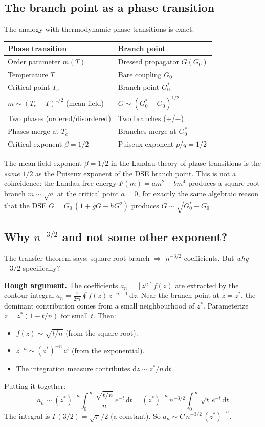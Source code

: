 \documentclass[11pt,a4paper]{article}
\theoremstyle{definition}
\newcommand{\dd}{\mathrm{d}}
\begin{document}
\subsection{The branch point as a phase transition}

The analogy with thermodynamic phase transitions is exact:

\begin{center}
\renewcommand{\arraystretch}{1.3}
\begin{tabular}{ll}
\toprule
\textbf{Phase transition} & \textbf{Branch point} \\
\midrule
Order parameter $m(T)$ & Dressed propagator $G(G_0)$ \\
Temperature $T$ & Bare coupling $G_0$ \\
Critical point $T_c$ & Branch point $G_0^*$ \\
$m \sim (T_c - T)^{1/2}$ (mean-field) & $G \sim (G_0^* - G_0)^{1/2}$ \\
Two phases (ordered/disordered) & Two branches ($+$/$-$) \\
Phases merge at $T_c$ & Branches merge at $G_0^*$ \\
Critical exponent $\beta = 1/2$ & Puiseux exponent $p/q = 1/2$ \\
\bottomrule
\end{tabular}
\end{center}

The mean-field exponent $\beta = 1/2$ in the Landau theory of phase
transitions is the \emph{same} $1/2$ as the Puiseux exponent of the DSE
branch point. This is not a coincidence: the Landau free energy
$F(m) = am^2 + bm^4$ produces a square-root branch $m \sim \sqrt{a}$
at the critical point $a = 0$, for exactly the same algebraic reason
that the DSE $G = G_0\,(1 + gG - hG^2)$ produces $G \sim \sqrt{G_0^* - G_0}$.

\subsection{Why $n^{-3/2}$ and not some other exponent?}

The transfer theorem says: square-root branch $\Rightarrow$ $n^{-3/2}$
coefficients. But \emph{why} $-3/2$ specifically?

\textbf{Rough argument.} The coefficients $a_n = [z^n]f(z)$ are extracted
by the contour integral $a_n = \frac{1}{2\pi i}\oint f(z)\, z^{-n-1}\,\dd z$.
Near the branch point at $z = z^*$, the dominant contribution comes from
a small neighbourhood of $z^*$. Parameterize $z = z^*(1 - t/n)$ for small
$t$. Then:
\begin{itemize}
\item $f(z) \sim \sqrt{t/n}$ (from the square root).
\item $z^{-n} \sim (z^*)^{-n}\, e^{t}$ (from the exponential).
\item The integration measure contributes $\dd z \sim z^*/n\, \dd t$.
\end{itemize}
Putting it together:
\[
a_n \sim (z^*)^{-n} \int_0^\infty \frac{\sqrt{t/n}}{n}\, e^{-t}\, \dd t
= (z^*)^{-n}\, n^{-3/2} \int_0^\infty \sqrt{t}\, e^{-t}\, \dd t
\]
The integral is $\Gamma(3/2) = \sqrt{\pi}/2$ (a constant). So
$a_n \sim C\, n^{-3/2}\, (z^*)^{-n}$.
\end{document}
